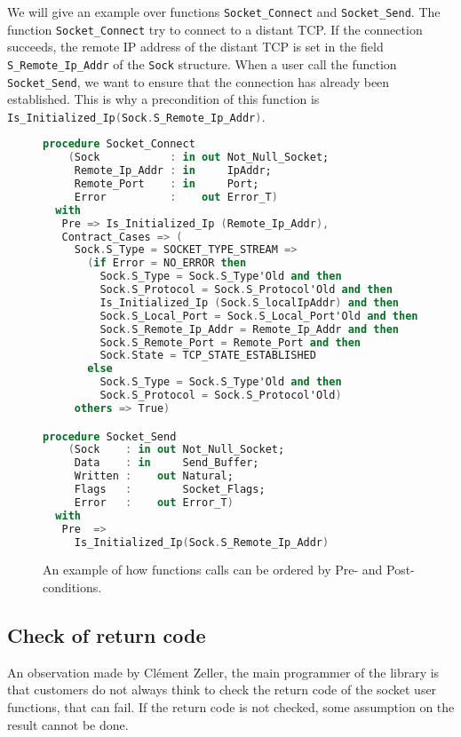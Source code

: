 \documentclass[a4paper, 10pt]{article}
\begin{document}
    We will give an example over functions \lstinline[language=Ada]{Socket_Connect} and
    \lstinline[language=Ada]{Socket_Send}. The function \lstinline[language=Ada]{Socket_Connect}
    try to connect to a distant TCP. If the connection succeeds, the remote IP address of the distant
    TCP is set in the field \lstinline[language=Ada]{S_Remote_Ip_Addr} of the \lstinline[language=Ada]{Sock}
    structure. When a user call the function \lstinline[language=Ada]{Socket_Send}, we want to ensure that
    the connection has already been established. This is why a precondition of this function is
    \lstinline[language=Ada]{Is_Initialized_Ip(Sock.S_Remote_Ip_Addr)}.


    \begin{figure}
        \begin{lstlisting}[language=Ada]
procedure Socket_Connect
    (Sock           : in out Not_Null_Socket;
     Remote_Ip_Addr : in     IpAddr;
     Remote_Port    : in     Port;
     Error          :    out Error_T)
  with
   Pre => Is_Initialized_Ip (Remote_Ip_Addr),
   Contract_Cases => (
     Sock.S_Type = SOCKET_TYPE_STREAM =>
       (if Error = NO_ERROR then
         Sock.S_Type = Sock.S_Type'Old and then
         Sock.S_Protocol = Sock.S_Protocol'Old and then
         Is_Initialized_Ip (Sock.S_localIpAddr) and then
         Sock.S_Local_Port = Sock.S_Local_Port'Old and then
         Sock.S_Remote_Ip_Addr = Remote_Ip_Addr and then
         Sock.S_Remote_Port = Remote_Port and then
         Sock.State = TCP_STATE_ESTABLISHED
       else
         Sock.S_Type = Sock.S_Type'Old and then
         Sock.S_Protocol = Sock.S_Protocol'Old)
     others => True)

procedure Socket_Send
    (Sock    : in out Not_Null_Socket;
     Data    : in     Send_Buffer;
     Written :    out Natural;
     Flags   :        Socket_Flags;
     Error   :    out Error_T)
  with
   Pre  =>
     Is_Initialized_Ip(Sock.S_Remote_Ip_Addr)
        \end{lstlisting}
        \caption{An example of how functions calls can be ordered by Pre- and Post-conditions.}
        \label{code:FunOrdered}
    \end{figure}

    \subsection{Check of return code}

    An observation made by Clément Zeller, the main programmer of the library is that customers
    do not always think to check the return code of the socket user functions, that can fail.
    If the return code is not checked, some assumption on the result cannot be done.
\end{document}
